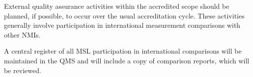 External quality assurance activities within the accredited scope should be planned, if possible, to occur over the usual accreditation cycle. These activities generally involve participation in international measurement comparisons with other NMIs.     

A central register of all MSL participation in international comparisons will be maintained in the QMS and will include a copy of comparison reports, which will be reviewed.  






